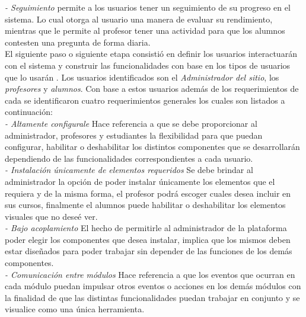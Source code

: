     {\it - Seguimiento} permite a los usuarios tener un seguimiento de su progreso
    en el sistema. Lo cual otorga al usuario una manera de evaluar su rendimiento,
    mientras que le permite al profesor tener una actividad para que los alumnos
    contesten una pregunta de forma diaria.\\

    \noindent
    El siguiente paso o siguiente etapa consistió en definir los usuarios
    interactuarán con el sistema y construir las funcionalidades con base en los
    tipos de usuarios que lo usarán \cite[p. 64]{ForTheWin}. Los usuarios
    identificados son el {\it Administrador del sitio}, los {\it profesores} y
    {\it alumnos}. Con base a estos usuarios además de los requerimientos de cada se
    identificaron cuatro requerimientos generales los cuales son listados a
    continuación:\\

    {\it - Altamente configurale}
        Hace referencia a que se debe proporcionar al administrador, profesores
        y estudiantes la flexibilidad para que puedan configurar, habilitar o
        deshabilitar los distintos componentes que se desarrollarán dependiendo
        de las funcionalidades correspondientes a cada usuario.\\

    {\it - Instalación únicamente de elementos requeridos}
        Se debe brindar al administrador la opción de poder instalar únicamente
        los elementos que el requiera y de la misma forma, el profesor podrá escoger
        cuales desea incluir en sus cursos, finalmente el alumnos puede habilitar o
        deshabilitar los elementos visuales que no deseé ver.\\

    {\it - Bajo acoplamiento}
        El hecho de permitirle al administrador de la plataforma poder elegir los
        componentes que desea instalar, implica que los mismos deben estar
        diseñados para poder trabajar sin depender de las funciones de los demás
        componentes.\\

    {\it - Comunicación entre módulos}
        Hace referencia a que los eventos que ocurran en cada módulo puedan impulsar
        otros eventos o acciones en los demás módulos con la finalidad de que las
        distintas funcionalidades puedan trabajar en conjunto y se visualice como
        una única herramienta.\\


